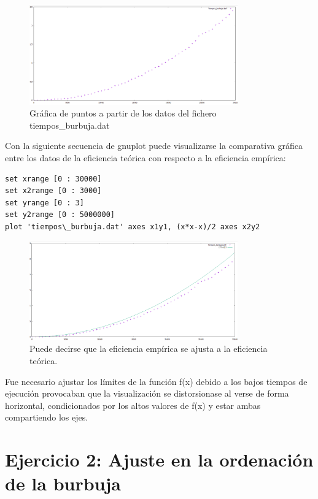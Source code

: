 \documentclass[paper=a4, fontsize=10pt]{scrartcl} %
\begin{document}
\begin{figure}[H] %
	\centering
	\label{lsblk}
	\includegraphics[width=0.8\textwidth]{../imgs/c1.PNG}
	\caption{Gráfica de puntos a partir de los datos del fichero tiempos\_burbuja.dat} 
\end{figure}

Con la siguiente secuencia de gnuplot puede visualizarse la comparativa gráfica entre los datos de la eficiencia teórica con respecto a la eficiencia empírica:

\begin{lstlisting}
set xrange [0 : 30000]
set x2range [0 : 3000]
set yrange [0 : 3]
set y2range [0 : 5000000]
plot 'tiempos\_burbuja.dat' axes x1y1, (x*x-x)/2 axes x2y2
\end{lstlisting}
\begin{figure}[H] %
	\centering
	\label{lsblk}
	\includegraphics[width=0.8\textwidth]{../imgs/c2.PNG}
	\caption{Puede decirse que la eficiencia empírica se ajusta a la eficiencia teórica.} 
\end{figure}

Fue necesario ajustar los límites de la función f(x) debido a los bajos tiempos de ejecución provocaban que la visualización se distorsionase al verse de forma horizontal, condicionados por los altos valores de f(x) y estar ambas compartiendo los ejes.

\section{ Ejercicio 2: Ajuste en la ordenación de la burbuja}
\end{document}
